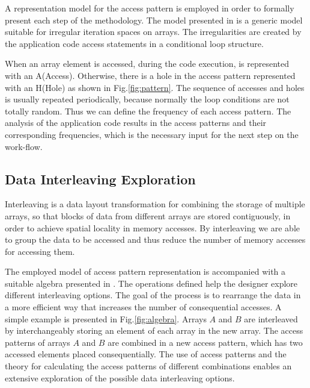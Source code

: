 \documentclass[prodmode,acmtodaes]{acmsmall}
\begin{document}
A representation model for the access pattern is employed in order to formally present each step of the methodology.
The model presented in \cite{Ang13} is a generic model suitable for irregular iteration spaces on arrays.
The irregularities are created by the application code access statements in a conditional loop structure.

When an array element is accessed, during the code execution, is represented with an A(Access).
Otherwise, there is a hole in the access pattern represented with an H(Hole) as shown in Fig.\ref{fig:pattern}.
The sequence of accesses and holes is usually repeated periodically, because normally the loop conditions are not totally random.
Thus we can define the frequency of each access pattern.
The analysis of the application code results in the access patterns and their corresponding frequencies, which is the necessary input for the next step on the work-flow.


\subsection{Data Interleaving Exploration}
Interleaving is a data layout transformation for combining the storage of multiple arrays, so that blocks of data from different arrays are stored contiguously, in order to achieve spatial locality in memory accesses.
By interleaving we are able to group the data to be accessed and thus reduce the number of memory accesses for accessing them.

The employed model of access pattern representation is accompanied with a suitable algebra presented in \cite{kritikakou2013phd}.
The operations defined help the designer explore different interleaving options.
The goal of the process is to rearrange the data in a more efficient way that increases the number of consequential accesses.
A simple example is presented in Fig.\ref{fig:algebra}.
Arrays $A$ and $B$ are interleaved by interchangeably storing an element of each array in the new array. 
The access patterns of arrays $A$ and $B$ are combined in a new access pattern, which has two accessed elements placed consequentially.
The use of access patterns and the theory for calculating the access patterns of different combinations enables an extensive exploration of the possible data interleaving options.
\end{document}
